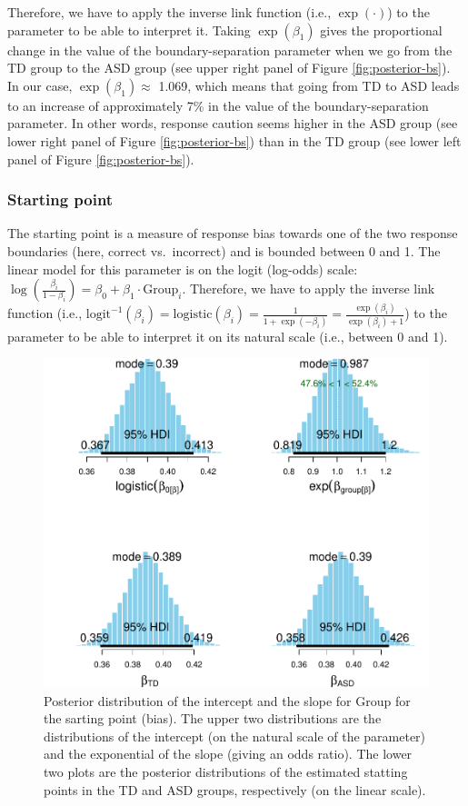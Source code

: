 \documentclass[
  11pt,
  english,
  ,doc,floatsintext]{apa6}
\begin{document}
Therefore, we have to apply the inverse link function (i.e., \(\exp(\cdot)\)) to the parameter to be able to interpret it. Taking \(\exp(\beta_{1})\) gives the proportional change in the value of the boundary-separation parameter when we go from the TD group to the ASD group (see upper right panel of Figure \ref{fig:posterior-bs}). In our case, \(\exp(\beta_{1}) \approx\) 1.069, which means that going from TD to ASD leads to an increase of approximately 7\% in the value of the boundary-separation parameter. In other words, response caution seems higher in the ASD group (see lower right panel of Figure \ref{fig:posterior-bs}) than in the TD group (see lower left panel of Figure \ref{fig:posterior-bs}).

\hypertarget{starting-point}{%
\subsubsection{Starting point}\label{starting-point}}

The starting point is a measure of response bias towards one of the two response boundaries (here, correct vs.~incorrect) and is bounded between 0 and 1. The linear model for this parameter is on the logit (log-odds) scale: \(\log(\frac{\beta_{i}}{1 - \beta_{i}}) = \beta_{0} + \beta_{1} \cdot \text{Group}_{i}\). Therefore, we have to apply the inverse link function (i.e., \(\mathrm{logit}^{-1}(\beta_{i}) = \mathrm{logistic}(\beta_{i}) = \frac{1}{1 + \exp(- \beta_{i})} = \frac{\exp(\beta_{i})}{\exp(\beta_{i}) + 1}\)) to the parameter to be able to interpret it on its natural scale (i.e., between 0 and 1).

\begin{figure}[!htb]

{\centering \includegraphics[width=0.75\linewidth]{supplementary_materials_files/figure-latex/posterior-bias-1} 

}

\caption{Posterior distribution of the intercept and the slope for Group for the sarting point (bias). The upper two distributions are the distributions of the intercept (on the natural scale of the parameter) and the exponential of the slope (giving an odds ratio). The lower two plots are the posterior distributions of the estimated statting points in the TD and ASD groups, respectively (on the linear scale).}\label{fig:posterior-bias}
\end{figure}
\end{document}

